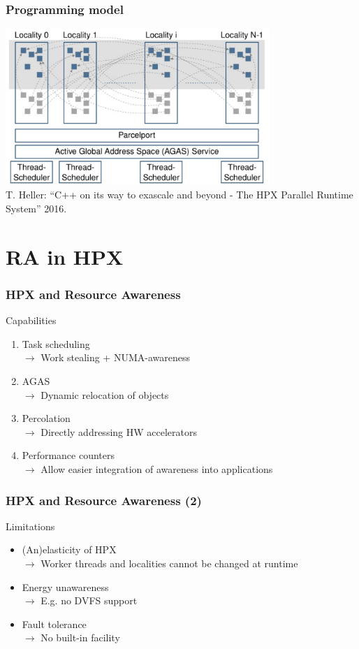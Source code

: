 \documentclass[compress]{beamer}
\begin{document}
\begin{frame}
	\frametitle{Programming model}
	\begin{center}
		\includegraphics[width=100mm]{Figures/hpxProgrammingModel4.png}\\
		\vspace{3mm}
		\tiny T. Heller: “C++ on its way to exascale and beyond - The HPX Parallel Runtime System” 2016.
		\normalsize
	\end{center}
\end{frame}

\section{RA in HPX}
\begin{frame}
	\frametitle{HPX and Resource Awareness}
	\pause
	Capabilities
	\begin{enumerate}
		\item Task scheduling\\
			\small $\longrightarrow$ Work stealing + NUMA-awareness
		\normalsize
		\pause
		\item AGAS\\
			\small $\longrightarrow$ Dynamic relocation of objects
		\normalsize
		\pause
		\item Percolation\\
			\small $\longrightarrow$ Directly addressing HW accelerators
		\normalsize
		\pause
		\item Performance counters\\
			\small $\longrightarrow$ Allow easier integration of awareness into applications
		\normalsize
	\end{enumerate}
\end{frame}

\begin{frame}
	\frametitle{HPX and Resource Awareness (2)}
	Limitations
	\begin{itemize}
		\item (An)elasticity of HPX\\
			\small $\longrightarrow$ Worker threads and localities cannot be changed at runtime
		\normalsize
		\pause
		\item Energy unawareness\\
			\small $\longrightarrow$ E.g. no DVFS support
		\normalsize
		\pause
		\item Fault tolerance\\
			\small $\longrightarrow$ No built-in facility
		\normalsize
	\end{itemize}
\end{frame}
\end{document}
